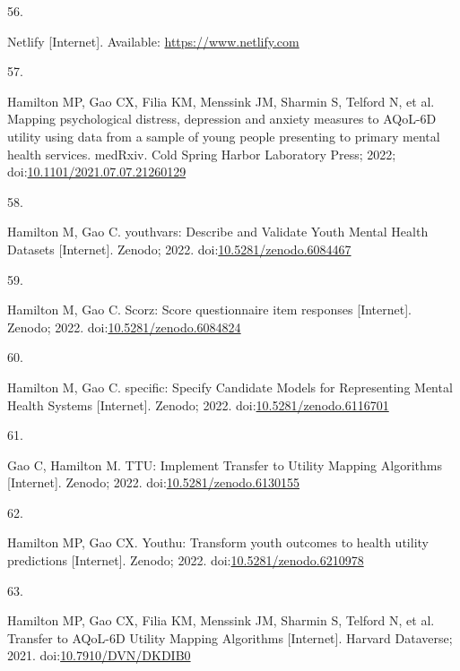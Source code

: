 \documentclass[
]{article}
\newlength{\cslhangindent}
\newlength{\csllabelwidth}
\newlength{\cslentryspacingunit} %
\newenvironment{CSLReferences}[2] %
 {%
  \setlength{\parindent}{0pt}
  \ifodd #1
  \let\oldpar\par
  \def\par{\hangindent=\cslhangindent\oldpar}
  \fi
  \setlength{\parskip}{#2\cslentryspacingunit}
 }%
 {}
\newcommand{\CSLLeftMargin}[1]{\parbox[t]{\csllabelwidth}{#1}}
\newcommand{\CSLRightInline}[1]{\parbox[t]{\linewidth - \csllabelwidth}{#1}\break}
\begin{document}
\begin{CSLReferences}{0}{0}
\leavevmode{}%
\CSLLeftMargin{56. }%
\CSLRightInline{Netlify {[}Internet{]}. Available: \url{https://www.netlify.com}}

\leavevmode{}%
\CSLLeftMargin{57. }%
\CSLRightInline{Hamilton MP, Gao CX, Filia KM, Menssink JM, Sharmin S, Telford N, et al. Mapping psychological distress, depression and anxiety measures to AQoL-6D utility using data from a sample of young people presenting to primary mental health services. medRxiv. Cold Spring Harbor Laboratory Press; 2022; doi:\href{https://doi.org/10.1101/2021.07.07.21260129}{10.1101/2021.07.07.21260129}}

\leavevmode{}%
\CSLLeftMargin{58. }%
\CSLRightInline{Hamilton M, Gao C. {youthvars: Describe and Validate Youth Mental Health Datasets} {[}Internet{]}. Zenodo; 2022. doi:\href{https://doi.org/10.5281/zenodo.6084467}{10.5281/zenodo.6084467}}

\leavevmode{}%
\CSLLeftMargin{59. }%
\CSLRightInline{Hamilton M, Gao C. Scorz: Score questionnaire item responses {[}Internet{]}. Zenodo; 2022. doi:\href{https://doi.org/10.5281/zenodo.6084824}{10.5281/zenodo.6084824}}

\leavevmode{}%
\CSLLeftMargin{60. }%
\CSLRightInline{Hamilton M, Gao C. {specific: Specify Candidate Models for Representing Mental Health Systems} {[}Internet{]}. Zenodo; 2022. doi:\href{https://doi.org/10.5281/zenodo.6116701}{10.5281/zenodo.6116701}}

\leavevmode{}%
\CSLLeftMargin{61. }%
\CSLRightInline{Gao C, Hamilton M. {TTU: Implement Transfer to Utility Mapping Algorithms} {[}Internet{]}. Zenodo; 2022. doi:\href{https://doi.org/10.5281/zenodo.6130155}{10.5281/zenodo.6130155}}

\leavevmode{}%
\CSLLeftMargin{62. }%
\CSLRightInline{Hamilton MP, Gao CX. Youthu: Transform youth outcomes to health utility predictions {[}Internet{]}. Zenodo; 2022. doi:\href{https://doi.org/10.5281/zenodo.6210978}{10.5281/zenodo.6210978}}

\leavevmode{}%
\CSLLeftMargin{63. }%
\CSLRightInline{Hamilton MP, Gao CX, Filia KM, Menssink JM, Sharmin S, Telford N, et al. {Transfer to AQoL-6D Utility Mapping Algorithms} {[}Internet{]}. Harvard Dataverse; 2021. doi:\href{https://doi.org/10.7910/DVN/DKDIB0}{10.7910/DVN/DKDIB0}}


\end{CSLReferences}
\end{document}
